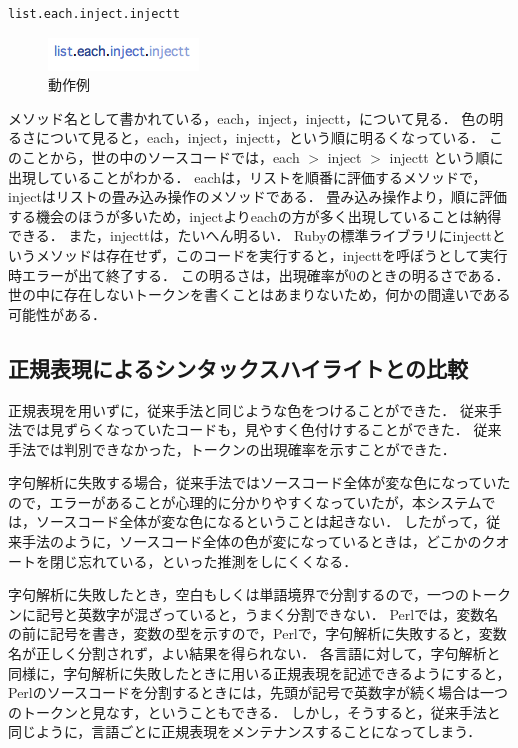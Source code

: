 \documentclass{cs-thesis}
\begin{document}
\begin{framed}
\begin{verbatim}
list.each.inject.injectt
\end{verbatim}
\end{framed}

  \begin{figure}[htbp]
   \centering
   \includegraphics[scale=0.8]{example-identifier-color.png}
   \caption{動作例}
   \label{example-identifier-color}
  \end{figure}

  メソッド名として書かれている，each，inject，injectt，について見る．
  色の明るさについて見ると，each，inject，injectt，という順に明るくなっている．
  このことから，世の中のソースコードでは，each $>$ inject $>$ injectt という順に出現していることがわかる．
  eachは，リストを順番に評価するメソッドで，injectはリストの畳み込み操作のメソッドである．
  畳み込み操作より，順に評価する機会のほうが多いため，injectよりeachの方が多く出現していることは納得できる．
  また，injecttは，たいへん明るい．
  Rubyの標準ライブラリにinjecttというメソッドは存在せず，このコードを実行すると，injecttを呼ぼうとして実行時エラーが出て終了する．
  この明るさは，出現確率が0のときの明るさである．
  世の中に存在しないトークンを書くことはあまりないため，何かの間違いである可能性がある．

  \subsection{正規表現によるシンタックスハイライトとの比較}
  正規表現を用いずに，従来手法と同じような色をつけることができた．
  従来手法では見ずらくなっていたコードも，見やすく色付けすることができた．
  従来手法では判別できなかった，トークンの出現確率を示すことができた．

  字句解析に失敗する場合，従来手法ではソースコード全体が変な色になっていたので，エラーがあることが心理的に分かりやすくなっていたが，本システムでは，ソースコード全体が変な色になるということは起きない．
  したがって，従来手法のように，ソースコード全体の色が変になっているときは，どこかのクオートを閉じ忘れている，といった推測をしにくくなる．

  字句解析に失敗したとき，空白もしくは単語境界で分割するので，一つのトークンに記号と英数字が混ざっていると，うまく分割できない．
  Perlでは，変数名の前に記号を書き，変数の型を示すので，Perlで，字句解析に失敗すると，変数名が正しく分割されず，よい結果を得られない．
  各言語に対して，字句解析と同様に，字句解析に失敗したときに用いる正規表現を記述できるようにすると，Perlのソースコードを分割するときには，先頭が記号で英数字が続く場合は一つのトークンと見なす，ということもできる．
  しかし，そうすると，従来手法と同じように，言語ごとに正規表現をメンテナンスすることになってしまう．
\end{document}
